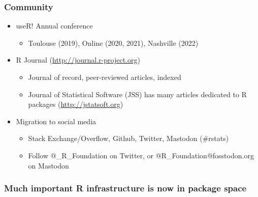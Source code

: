 \documentclass[svgnames, aspectratio=169]{beamer}
\begin{document}
\begin{frame}
  \frametitle{Community}
  \begin{itemize}
  \item useR! Annual conference
    \begin{itemize}
    \item Toulouse (2019), Online (2020, 2021), Nashville (2022)
    \end{itemize}
  \item R Journal (\url{http://journal.r-project.org})
    \begin{itemize}
    \item Journal of record, peer-reviewed articles, indexed
    \item Journal of Statistical Software (JSS) has many articles
      dedicated to R packages (\url{http://jstatsoft.org})
    \end{itemize}
  \item Migration to social media
    \begin{itemize}
    \item Stack Exchange/Overflow, Github, Twitter, Mastodon (\#rstats)
    \item Follow @\_R\_Foundation on Twitter, or
      @R\_Foundation@fosstodon.org on Mastodon
    \end{itemize}
  \end{itemize}
\end{frame}

\begin{frame}
  \frametitle{Much important R infrastructure is now in package space}

  \begin{center}
  \end{center}
    
\end{frame}
\end{document}
